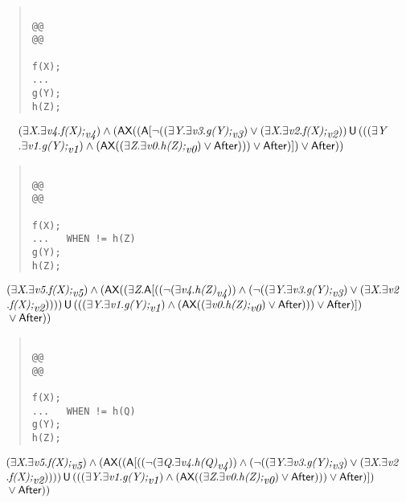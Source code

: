\documentclass{article}
\newcommand{\U}{\,\mbox{\sf{U}}\,}
\newcommand{\A}{\mbox{\sf{A}}}
\newcommand{\AX}{\mbox{\sf{AX}}}
\newcommand{\mita}[1]{\mbox{\it{{#1}}}}
\newcommand{\msf}[1]{\mbox{\sf{{#1}}}}
\begin{document}
\begin{quote}\begin{verbatim}

@@
@@

f(X);
...
g(Y);
h(Z);
\end{verbatim}\end{quote}

\[\begin{array}{l}
(\exists \mita{X} . \exists \mita{v4} . \mita{f(X);}_{\mita{v4}}) \wedge (\AX((\A[\neg ((\exists \mita{Y} . \exists \mita{v3} . \mita{g(Y);}_{\mita{v3}}) \vee (\exists \mita{X} . \exists \mita{v2} . \mita{f(X);}_{\mita{v2}})) \U (((\exists \mita{Y}\\\mbox{} . \exists \mita{v1} . \mita{g(Y);}_{\mita{v1}}) \wedge (\AX((\exists \mita{Z} . \exists \mita{v0} . \mita{h(Z);}_{\mita{v0}}) \vee \msf{After}))) \vee \msf{After})]
) \vee \msf{After}))
\end{array}\]

\begin{quote}\begin{verbatim}

@@
@@

f(X);
...   WHEN != h(Z)
g(Y);
h(Z);
\end{verbatim}\end{quote}

\[\begin{array}{l}
(\exists \mita{X} . \exists \mita{v5} . \mita{f(X);}_{\mita{v5}}) \wedge (\AX((\exists \mita{Z} . \A[((\neg (\exists \mita{v4} . \mita{h(Z)}_{\mita{v4}})) \wedge (\neg ((\exists \mita{Y} . \exists \mita{v3} . \mita{g(Y);}_{\mita{v3}}) \vee (\exists \mita{X} . \exists \mita{v2}\\\mbox{} . \mita{f(X);}_{\mita{v2}})))) \U (((\exists \mita{Y} . \exists \mita{v1} . \mita{g(Y);}_{\mita{v1}}) \wedge (\AX((\exists \mita{v0} . \mita{h(Z);}_{\mita{v0}}) \vee \msf{After}))) \vee \msf{After})]
)\\\mbox{} \vee \msf{After}))
\end{array}\]

\begin{quote}\begin{verbatim}

@@
@@

f(X);
...   WHEN != h(Q)
g(Y);
h(Z);
\end{verbatim}\end{quote}

\[\begin{array}{l}
(\exists \mita{X} . \exists \mita{v5} . \mita{f(X);}_{\mita{v5}}) \wedge (\AX((\A[((\neg (\exists \mita{Q} . \exists \mita{v4} . \mita{h(Q)}_{\mita{v4}})) \wedge (\neg ((\exists \mita{Y} . \exists \mita{v3} . \mita{g(Y);}_{\mita{v3}}) \vee (\exists \mita{X} . \exists \mita{v2}\\\mbox{} . \mita{f(X);}_{\mita{v2}})))) \U (((\exists \mita{Y} . \exists \mita{v1} . \mita{g(Y);}_{\mita{v1}}) \wedge (\AX((\exists \mita{Z} . \exists \mita{v0} . \mita{h(Z);}_{\mita{v0}}) \vee \msf{After}))) \vee \msf{After})]
)\\\mbox{} \vee \msf{After}))
\end{array}\]
\end{document}
